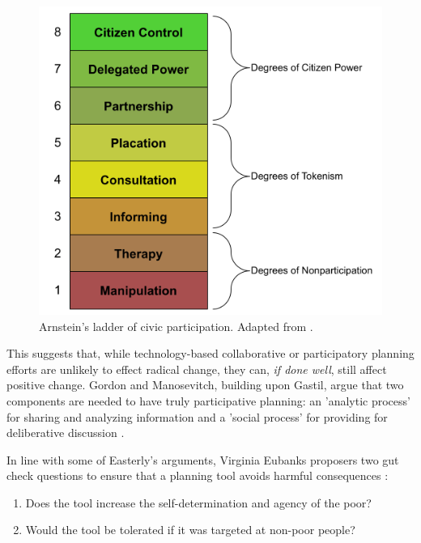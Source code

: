 \begin{figure}[!htb]
	\centering
	\includegraphics[scale=0.5]{Figures/chap2/civic_ladder.png}
	\caption[Arnstein's ladder of civic participation]{Arnstein's ladder of civic participation. Adapted from \cite{arnsteinLadderCitizenParticipation1969}.}
	\label{fig:civic_ladder}
\end{figure}

This suggests that, while technology-based collaborative or participatory planning efforts are unlikely to effect radical change, they can, \textit{if done well}, still affect positive change. Gordon and Manosevitch, building upon Gastil, argue that two components are needed to have truly participative planning: an 'analytic process' for sharing and analyzing information and a 'social process' for providing for deliberative discussion \cite{gordonAugmentedDeliberationMerging2011}. 

In line with some of Easterly's arguments, Virginia Eubanks proposers two gut check questions to ensure that a planning tool avoids harmful consequences \cite{eubanksAutomatingInequalityHow2018}:

\begin{enumerate} \setlength{\itemsep}{0pt} \setlength{\parskip}{0pt} 
	\item{Does the tool increase the self-determination and agency of the poor?}
	\item{Would the tool be tolerated if it was targeted at non-poor people?}
\end{enumerate}

